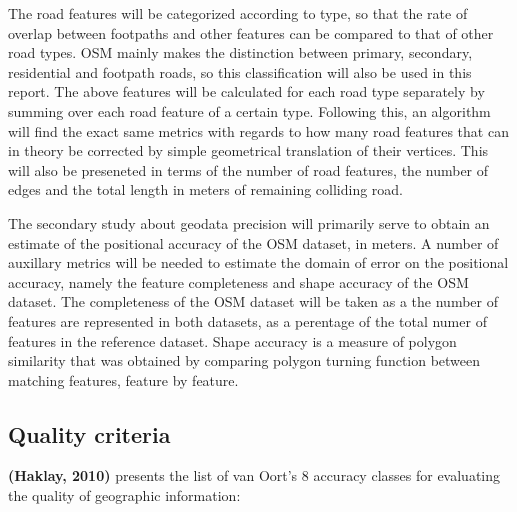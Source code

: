 \documentclass{kththesis}
\begin{document}
The road features will be categorized according to type, so that the rate of overlap between footpaths and other features can be compared to that of other road types.
OSM mainly makes the distinction between primary, secondary, residential and footpath roads, so this classification will also be used in this report.
The above features will be calculated for each road type separately by summing over each road feature of a certain type.
Following this, an algorithm will find the exact same metrics with regards to how many road features that can in theory be corrected by simple geometrical translation of their vertices.
This will also be preseneted in terms of the number of road features, the number of edges and the total length in meters of remaining colliding road.

The secondary study about geodata precision will primarily serve to obtain an estimate of the positional accuracy of the OSM dataset, in meters.
A number of auxillary metrics will be needed to estimate the domain of error on the positional accuracy, namely the feature completeness and shape accuracy of the OSM dataset.
The completeness of the OSM dataset will be taken as a the number of features are represented in both datasets, as a perentage of the total numer of features in the reference dataset.
Shape accuracy is a measure of polygon similarity that was obtained by comparing polygon turning function between matching features, feature by feature.

\subsection{Quality criteria}

\textbf{(Haklay, 2010)} presents the list of van Oort's 8 accuracy classes for evaluating the quality of geographic information:
\end{document}
